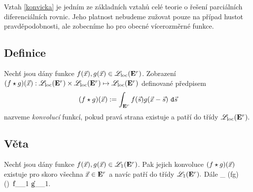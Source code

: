 Vztah \eqref{konvicka} je jedn\'im ze z\'akladn\'ich vztah\r u cel\'e teorie o \v re\v sen\'i parci\'aln\'ich diferenci\'aln\'ich rovnic. Jeho platnost nebudeme zu\v zovat pouze na p\v r\'ipad hustot pravd\v epodobnosti, ale zobecn\'ime ho pro obecn\'e v\'icerozm\v ern\'e funkce.

\subsection{Definice}\label{klasa-konvo}
Nechť jsou dány funkce $f({\vec{x}}),g({\vec{x}})\in \mathscr{L}_{\mathrm{loc}}{({{\mathbf E}^r})}$. Zobrazení
$(f\star g)({\vec{x}}):\mathscr{L}_{\mathrm{loc}}{({{\mathbf E}^r})} \times \mathscr{L}_{\mathrm{loc}}{({{\mathbf E}^r})}\mapsto \mathscr{L}_{\mathrm{loc}}{({{\mathbf E}^r})}$
definované předpisem
%
$$(f\star g)({\vec{x}}):=\int_{{{\mathbf E}^r}}f({\vec{s}})g({\vec{x}}-{\vec{s}})~\mathtt{d}{\vec{s}}$$
%
nazveme \emph{konvoluc\'i} funkcí, pokud pravá strana existuje a
patří do t\v r\'idy $\mathscr{L}_{\mathrm{loc}}{({{\mathbf E}^r})}.$

\subsection{Věta}\label{existuje_konvo}

Nechť jsou dány funkce $f({\vec{x}}),g({\vec{x}})\in {\mathscr L}_1{({{\mathbf E}^r})}$. Pak jejich konvoluce $(f\star g)({\vec{x}})$ existuje pro skoro v\v sechna ${\vec{x}}\in{{\mathbf E}^r}$ a nav\' ic patří do t\v r\'idy ${\mathscr L}_1{({{\mathbf E}^r})}.$ D\'ale 
%
\BE \int_{\Er} (f\star g)(\x)~\dxx \leq \|f\|_{\LLL_1} \cdot  \|g\|_{\LLL_1}. \label{zacapa} \EE

\Proof


